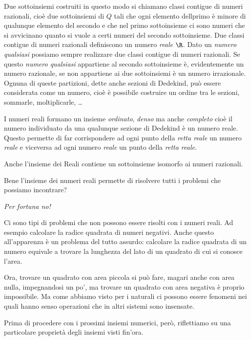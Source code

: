 Due sottoinsiemi costruiti in questo modo si chiamano classi contigue di 
numeri razionali, cioè due sottoinsiemi di \(Q\) tali che ogni elemento 
dellprimo è minore di qualunque elemento del secondo e che nel primo 
sottoinsieme ci sono numeri che si avvicinano quanto si vuole a certi 
numeri del secondo sottoinsieme.
Due classi contigue di numeri razionali definiscono un 
numero \emph{reale} $\R$. Dato un \emph{numero qualsiasi} possiamo sempre 
realizzare due classi contigue di numeri razionali. 
Se questo \emph{numero qualsiasi} appartiene al secondo sottoinsieme è, 
evidentemente un numero razionale, se non appartiene ai due sottoinsiemi è 
un numero irrazionale. 
Ognuna di queste partizioni, dette anche sezioni di Dedekind, può essere 
considerata come un numero, cioè è possibile costruire un ordine tra le 
sezioni, sommarle, moltiplicarle, \dots

I numeri reali formano un insieme \emph{ordinato}, \emph{denso} ma anche 
\emph{completo} cioè il numero individuato da una qualunque sezione di 
Dedekind è un numero reale.
Questo permette di far corrispondere ad ogni punto della \emph{retta reale} 
un numero \emph{reale} e viceversa ad ogni numero \emph{reale} un punto 
della \emph{retta reale}. 

Anche l'insieme dei Reali contiene un sottoinsieme isomorfo ai numeri 
razionali.

Bene l'insieme dei numeri reali permette di risolvere tutti i problemi che 
possiamo incontrare?
\vspace{-1em}
\begin{center} \emph{Per fortuna no!} \end{center}
\vspace{-.5em}
Ci sono tipi di problemi che non possono essere risolti con i numeri reali.
Ad esempio calcolare la radice quadrata di numeri negativi. 
Anche questo all'apparenza è un problema del tutto assurdo: calcolare la 
radice quadrata di un numero equivale a trovare la lunghezza del lato di un 
quadrato di cui si conosce l'area. 

Ora, trovare un quadrato con area piccola si può fare, magari anche con 
area nulla, impegnandosi un po', ma trovare un quadrato con area negativa 
è proprio impossibile. 
Ma come abbiamo visto per i naturali ci possono essere fenomeni nei quali 
hanno senso operazioni che in altri sistemi sono insensate.

Prima di procedere con i prossimi insiemi numerici, però, riflettiamo su 
una particolare proprietà degli insiemi visti fin'ora.

